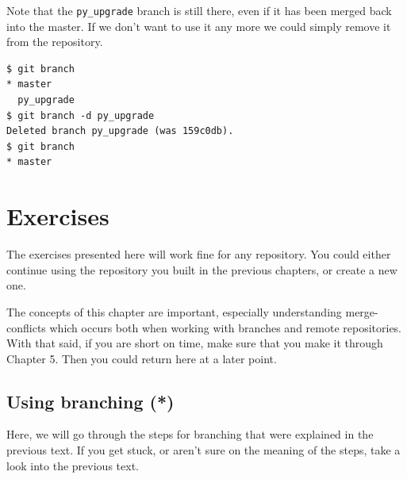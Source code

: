 \documentclass[../main/git_course_main.tex]{subfiles}
\begin{document}
Note that the \verb$py_upgrade$ branch is still there, even if it has been merged back into the master.
If we don't want to use it any more we could simply remove it from the repository.

\begin{codebox}
\begin{lstlisting}
$ git branch
* master
  py_upgrade
$ git branch -d py_upgrade
Deleted branch py_upgrade (was 159c0db).
$ git branch
* master
\end{lstlisting}
\end{codebox}

\newpage
\section{Exercises}

The exercises presented here will work fine for any repository. You could either continue using the repository you built in the previous chapters, or create a new one.

The concepts of this chapter are important, especially understanding merge-conflicts which occurs both when working with branches and remote repositories. With that said, if you are short on time, make sure that you make it through Chapter 5. Then you could return here at a later point.

\subsection{Using branching (*)}

Here, we will go through the steps for branching that were explained in the previous text. If you get stuck, or aren't sure on the meaning of the steps, take a look into the previous text.
\end{document}
